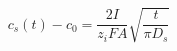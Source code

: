 \documentclass[preview]{standalone}
\begin{document}
\[c_s(t) - c_0 = \frac{2I}{z_i F A}\sqrt{\frac{t}{\pi D_s}}\]
\end{document}
